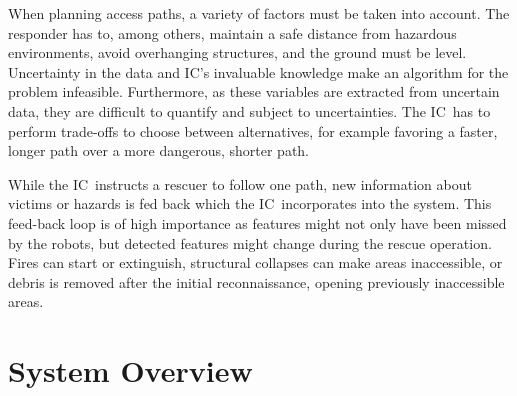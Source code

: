 \documentclass[conference,10pt,letter]{IEEEtran}
\def\IC{IC}
\begin{document}
When planning access paths, a variety of factors must be taken into account. The responder has to, among others, maintain a safe distance from hazardous environments, avoid overhanging structures, and the ground must be level. Uncertainty in the data and \IC 's invaluable knowledge make an algorithm for the problem infeasible. Furthermore, as these variables are extracted from uncertain data, they are difficult to quantify and subject to uncertainties. The \IC\ has to perform trade-offs to choose between alternatives, for example favoring a faster, longer path over a more dangerous, shorter path.

While the \IC\ instructs a rescuer to follow one path, new information about victims or hazards is fed back which the \IC\ incorporates into the system. This feed-back loop is of high importance as features might not only have been missed by the robots, but detected features might change during the rescue operation. Fires can start or extinguish, structural collapses can make areas inaccessible, or debris is removed after the initial reconnaissance, opening previously inaccessible areas. 


\section{System Overview} \label{sec:overview}
%
%
\end{document}
